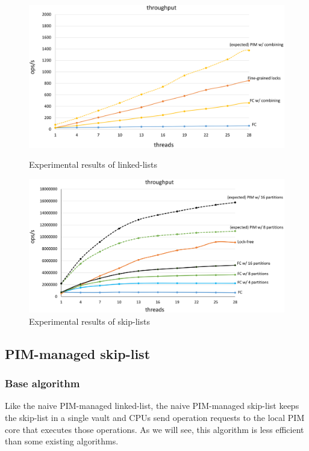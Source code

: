 \begin{figure}
    \centering
    \begin{minipage}{0.45\textwidth}
        \centering
        \includegraphics[width=.9\textwidth]{linkedlist_data.eps} %
        \caption{Experimental results of linked-lists}
        \label{figure:linkedlist_data}
    \end{minipage}\hfill
    \begin{minipage}{0.45\textwidth}
        \centering
        \includegraphics[width=.98\textwidth]{skiplist_data.eps} %
        \caption{Experimental results of skip-lists}
        \label{figure:skiplist_data}
    \end{minipage}
\end{figure}



\subsection{PIM-managed skip-list}
\label{section:skip_list}

\subsubsection{Base algorithm}
Like the naive PIM-managed linked-list,
the naive PIM-managed skip-list keeps the skip-list in a single vault and
CPUs send operation requests to the local PIM core that executes those operations.
As we will see, this algorithm is less efficient than some existing algorithms.

